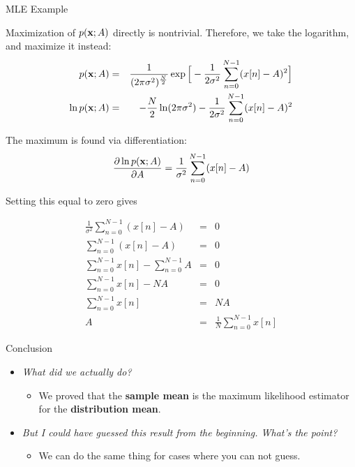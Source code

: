 \documentclass[10pt, aspectratio=169]{beamer} %
\newcommand{\x}{{\bf x}}
\begin{document}
\begin{frame}[fragile,allowframebreaks=0.8]
{MLE Example}
\begin{itemize}
{\small
\item Maximization of $p(\x;A)$ directly is nontrivial. Therefore,
  we take the logarithm, and maximize it instead:
\begin{eqnarray*}
p({\x};A) &=& \frac{1}{(2 \pi \sigma^2)^{\frac{N}{2}}} \exp\Big[-
  \frac{1}{2\sigma^2} \sum_{n=0}^{N-1} (x[n]-A)^2\Big]\\
\ln p(\x;A) &=& -\frac N2 \ln(2\pi\sigma^2)-
  \frac{1}{2\sigma^2} \sum_{n=0}^{N-1} (x[n]-A)^2
\end{eqnarray*}
\item The maximum is found via differentiation:
\[
\frac{\partial\ln p(\x;A) }{\partial A} = 
  \frac{1}{\sigma^2} \sum_{n=0}^{N-1} (x[n]-A)
\]
\item Setting this equal to zero gives
}
{\scriptsize
\begin{eqnarray*}
\frac{1}{\sigma^2} \sum_{n=0}^{N-1} (x[n]-A) &=& 0\\
\sum_{n=0}^{N-1} (x[n]-A) &=& 0\\
\sum_{n=0}^{N-1} x[n] - \sum_{n=0}^{N-1} A &=& 0\\
\sum_{n=0}^{N-1} x[n] - NA &=& 0\\
\sum_{n=0}^{N-1} x[n] &=& NA \\
A &=& \frac1N \sum_{n=0}^{N-1} x[n]
\end{eqnarray*}
}
\end{itemize}
\end{frame}

\begin{frame}[allowframebreaks=0.8]
{Conclusion}

\begin{itemize}
\item \textit{What did we actually do?}
\begin{itemize}
\item We proved that the \textbf{sample mean} is the maximum likelihood estimator for the \textbf{distribution mean}.
\end{itemize}

\item \textit{But I could have guessed this result from the beginning. What's the point?}
\begin{itemize}
\item We can do the same thing for cases where you can not guess.
\end{itemize}
\end{itemize}
\end{frame}
\end{document}
